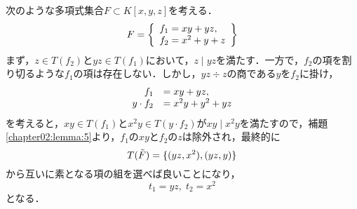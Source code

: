 \begin{example}
	次のような多項式集合$F\subset K[x, y, z]$を考える．
	\begin{equation}
		F = 
		\left\{
		\begin{array}{l}
			f_1 = xy + yz, \\
			f_2 = x^2 + y + z \notag
		\end{array}
		\right\}
	\end{equation}
	まず，$z \in T(f_2)$と$yz \in T(f_1)$において，$z \mid yz$を満たす．一方で，$f_2$の項を割り切るような$f_1$の項は存在しない．しかし，$yz \div z$の商である$y$を$f_2$に掛け，
	\begin{equation}
		\begin{array}{rl}
			f_1 &= xy + yz, \\
			y\cdot f_2 &= x^2y + y^2 + yz \notag
		\end{array}
	\end{equation}
	を考えると，$xy \in T(f_1)$と$x^2y \in T(y \cdot f_2)$が$xy \mid x^2y$を満たすので，補題\ref{chapter02:lemma:5}より，$f_1$の$xy$と$f_2$の$z$は除外され，最終的に
	\begin{equation}
		T(\tilde{F}) = \{ (yz, x^2), (yz, y) \} \notag
	\end{equation}
	から互いに素となる項の組を選べば良いことになり，
	$$t_1 = yz, \; t_2 = x^2$$
	となる．
\end{example}




















